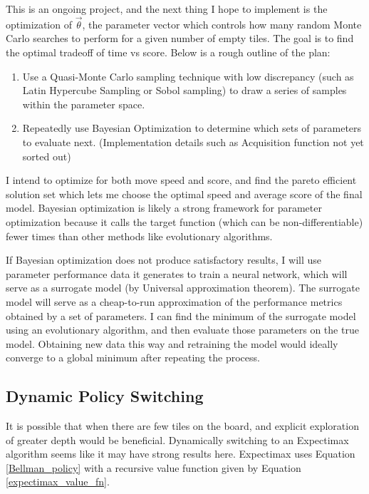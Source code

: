 \documentclass{article}
\begin{document}
This is an ongoing project, and the next thing I hope to implement is the optimization of $\vec{\theta}$, the parameter vector which controls how many random Monte Carlo searches to perform for a given number of empty tiles.  The goal is to find the optimal tradeoff of time vs score.  Below is a rough outline of the plan:
\begin{enumerate}
	\item Use a Quasi-Monte Carlo sampling technique with low discrepancy (such as Latin Hypercube Sampling or Sobol sampling) to draw a series of samples within the parameter space.
	\item Repeatedly use Bayesian Optimization to determine which sets of parameters to evaluate next. (Implementation details such as Acquisition function not yet sorted out)
\end{enumerate}

I intend to optimize for both move speed and score, and find the pareto efficient solution set which lets me choose the optimal speed and average score of the final model.   Bayesian optimization is likely a strong framework for parameter optimization because it calls the target function (which can be non-differentiable) fewer times than other methods like evolutionary algorithms.


If Bayesian optimization does not produce satisfactory results, I will use parameter performance data it generates to train a neural network, which will serve as a surrogate model (by Universal approximation theorem).  The surrogate model will serve as a cheap-to-run approximation of the performance metrics obtained by a set of parameters.  I can find the minimum of the surrogate model using an evolutionary algorithm, and then evaluate those parameters on the true model.  Obtaining new data this way and retraining the model would ideally converge to a global minimum after repeating the process.

\subsection{Dynamic Policy Switching}
It is possible that when there are few tiles on the board, and explicit exploration of greater depth would be beneficial.  Dynamically switching to an Expectimax algorithm seems like it may have strong results here.  Expectimax uses Equation \ref{Bellman_policy} with a recursive value function given by Equation  \ref{expectimax_value_fn}.
\end{document}
